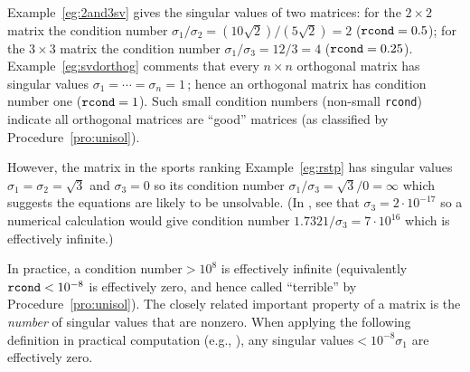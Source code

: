 \begin{example} \label{eg:condnum}
Example~\ref{eg:2and3sv} gives the singular values of two matrices:
for the \(2\times 2\) matrix the condition number  \(\sigma_1/\sigma_2=(10\sqrt2)/(5\sqrt2)=2\) (\(\verb|rcond|=0.5\)); for the \(3\times 3\) matrix the condition number \(\sigma_1/\sigma_3=12/3=4\) (\(\verb|rcond|=0.25\)).
Example~\ref{eg:svdorthog} comments that every \(n\times n\) orthogonal matrix has singular values \(\sigma_1=\cdots=\sigma_n=1\)\,; hence an orthogonal matrix has condition number one (\(\verb|rcond|=1\)).  
Such small condition numbers (non-small \verb|rcond|) indicate all orthogonal matrices are ``good'' matrices (as classified by Procedure~\ref{pro:unisol}).

However, the matrix in the sports ranking Example~\ref{eg:rstp} has singular values \(\sigma_1=\sigma_2=\sqrt3\) and \(\sigma_3=0\) so its condition number \(\sigma_1/\sigma_3=\sqrt3/0=\infty\) which suggests the equations are likely to be unsolvable.
(In \script, see that \(\sigma_3=2\cdot10^{-17}\) so a numerical calculation would give condition number \(1.7321/\sigma_3=7\cdot10^{16}\) which is effectively infinite.)
\end{example}

In practice, a condition number\({}>10^8\) is effectively infinite (equivalently \(\verb|rcond|<10^{-8}\) is effectively zero, and hence called ``terrible'' by Procedure~\ref{pro:unisol}).
The closely related important property of a matrix is the \emph{number} of singular values that are nonzero.
When applying the following definition in practical computation (e.g., \script), any singular values\({}<10^{-8}\sigma_1\) are effectively zero.


